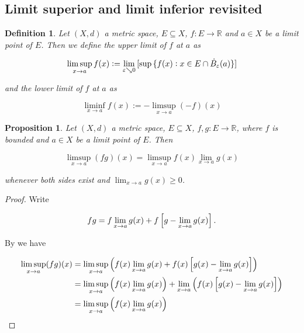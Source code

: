 \documentclass[11pt,oneside,a4paper,final]{amsart}
\theoremstyle{bold}
\newtheorem{definition}{Definition}[section]
\newtheorem{proposition}{Proposition}[section]
\begin{document}
\appendix
\begin{appendix}
    \section{Limit superior and limit inferior revisited}
    \begin{definition}
        Let $(X,d)$ a metric space, $E \subseteq X$, $f: E \to \mathbb{R}$ and $a \in X$ be a limit point of $E$. Then we define the \emph{upper limit of  $f$ at $a$} as

        \begin{equation*}
            \limsup_{x \to a}f(x) := \lim_{\varepsilon \searrow 0} \sbr[0]{ \sup\cbr[0]{ f(x) : x \in E \cap \dot{B}_\varepsilon(a)}}
        \end{equation*}

        \noindent and the \emph{lower limit of  $f$ at $a$} as

        \begin{equation*}
            \liminf_{x \to a}f(x) := -\limsup_{x \to a}( -f)(x)
        \end{equation*}
    \end{definition}

    \begin{proposition}
        Let $(X,d)$ a metric space, $E \subseteq X$, $f,g: E \rightarrow \mathbb{R}$, where $f$ is bounded and $a \in X$ be a limit point of $E$. Then

        \begin{equation*}
            \limsup_{x \to a} (fg)(x) = \limsup_{x \to a} f(x) \lim_{x \to a} g(x)
        \end{equation*}

        \noindent whenever both sides exist and $\lim_{x \to a}g(x) \geq 0$.
        \label{prop:limsup}
    \end{proposition}

    \begin{proof}
        Write

        \begin{equation*}
            fg = f\lim_{x\to a}g(x) + f\sbr[2]{ g - \lim_{x \to a}g(x)}.
        \end{equation*}

        By \cite[358]{bourbaki:general_topology:1995} we have

        \begin{gather*}
            \begin{aligned}
                \limsup_{x \to a} (fg)(x) & = \limsup_{x \to a}\del[2]{ f(x)\lim_{x\to a}g(x) + f(x)\sbr[2]{ g(x) - \lim_{x \to a}g(x)}}                          \\
                                          & = \limsup_{x \to a}\del[2]{ f(x)\lim_{x \to a}g(x)} + \lim_{x \to a}\del[2]{ f(x)\sbr[2]{ g(x) - \lim_{x \to a}g(x)}} \\
                                          & = \limsup_{x \to a}\del[2]{ f(x) \lim_{x \to a}g(x)}
            \end{aligned}
        \end{gather*}


\end{proof}
\end{appendix}
\end{document}

